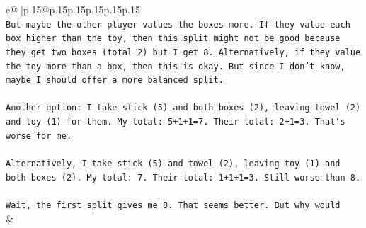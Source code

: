 \documentclass{article}
\begin{document}
{\begin{supertabular}{c@{$\;$}|p{.15\linewidth}@{}p{.15\linewidth}p{.15\linewidth}p{.15\linewidth}p{.15\linewidth}p{.15\linewidth}}
{{{\\ 
\texttt{But maybe the other player values the boxes more. If they value each box higher than the toy, then this split might not be good because they get two boxes (total 2) but I get 8. Alternatively, if they value the toy more than a box, then this is okay. But since I don't know, maybe I should offer a more balanced split.} \\
\\ 
\texttt{Another option: I take stick (5) and both boxes (2), leaving towel (2) and toy (1) for them. My total: 5+1+1=7. Their total: 2+1=3. That's worse for me.} \\
\\ 
\texttt{Alternatively, I take stick (5) and towel (2), leaving toy (1) and both boxes (2). My total: 7. Their total: 1+1+1=3. Still worse than 8.} \\
\\ 
\texttt{Wait, the first split gives me 8. That seems better. But why would} \\
            }
        }
    }
    & \\ \\


\end{supertabular}}
\end{document}
